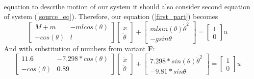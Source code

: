 \documentclass[a4paper,12pt]{article}
\begin{document}
    equation to describe motion of our system it should also consider second
    equation of system (\ref{source_eq}). Therefore, our equation (\ref{first_part})
    becomes
    \begin{equation}
        \begin{bmatrix}
            M+m & -mlcos(\theta) \\
            -cos(\theta) & l
        \end{bmatrix}
        \begin{bmatrix}
            \ddot x \\ 
            \ddot\theta
        \end{bmatrix}
        +
        \begin{bmatrix}
            mlsin(\theta)\dot\theta^2\\
            -gsin\theta
        \end{bmatrix}
        = 
        \begin{bmatrix}
            1\\
            0
        \end{bmatrix}u
    \end{equation}
    And with substitution of numbers from variant \textbf{F}:
    \begin{equation}
        \begin{bmatrix}
            11.6 & -7.298 * cos(\theta) \\
            -cos(\theta) & 0.89
        \end{bmatrix}
        \begin{bmatrix}
            \ddot x \\ 
            \ddot\theta
        \end{bmatrix}
        +
        \begin{bmatrix}
            7.298*sin(\theta)\dot\theta^2\\
            -9.81*sin\theta
        \end{bmatrix}
        = 
        \begin{bmatrix}
            1\\
            0
        \end{bmatrix}u
    \end{equation}
\end{document}
